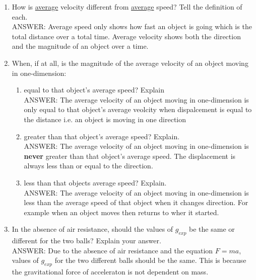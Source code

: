 \begin{enumerate}
  \item How is \underline{average} velocity different from \underline{average} speed? Tell the definition of each.\\
    ANSWER: Average speed only shows how fast an object is going which is the total distance over a total time.
    Average velocity shows both the direction and the magnitude of an object over a time.
  \item When, if at all, is the magnitude of the average velocity of an object moving in one-dimension:
  \begin{enumerate}
    \item equal to that object's average speed? Explain\\
      ANSWER: The average velocity of an object moving in one-dimension is only equal to that object's
      average veolcity when dispalcement is equal to the distance i.e. an object is moving in one direction
    \item greater than that object's average speed? Explain.\\
      ANSWER: The average velocity of an object moving in one-dimension is \textbf{never} greater than 
      that object's average speed. The displacement is always less than or equal to the direction.
    \item less than that objects average speed? Explain.\\
      ANSWER: The average velocity of an object moving in one-dimension is less than the average speed of
      that object when it changes direction. For example when an object moves then returns to wher it
      started.
  \end{enumerate}
\item In the absence of air resistance, should the values of $g_{exp}$ be the same or different for the two
    balls? Explain your answer.\\
    ANSWER: Due to the absence of air resistance and the equation $F=ma$, values of $g_{exp}$ for the two 
    different balls should be the same. This is because the gravitational force of acceleraton is not 
    dependent on mass.
\end{enumerate}
